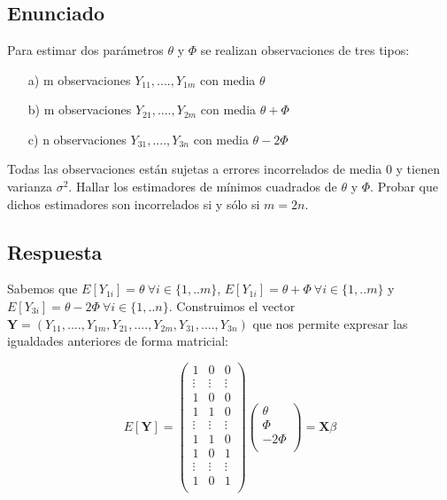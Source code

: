 \documentclass{article}
\begin{document}
\section{}

\subsection{Enunciado}

Para estimar dos parámetros $\theta$ y $\Phi$ se realizan observaciones de tres tipos:
\begin{enumerate}
    \item[a)] m observaciones $Y_{11}, .... , Y_{1m}$ con media $\theta$
    \item[b)] m observaciones $Y_{21}, .... , Y_{2m}$ con media $\theta + \Phi$ 
    \item[c)] n observaciones $Y_{31}, .... , Y_{3n}$ con media $ \theta - 2\Phi$
\end{enumerate}
Todas las observaciones están sujetas a errores incorrelados de media $0$ y tienen varianza $\sigma^2$. Hallar los estimadores de mínimos cuadrados de $\theta$ y $\Phi$. Probar que dichos estimadores son incorrelados si y sólo si $m=2n$.

\subsection{Respuesta}

Sabemos que $E[Y_{1i}] = \theta  \ \forall i \in \{1, .. m\}$, $E[Y_{1i}] = \theta + \Phi \ \forall i \in \{1, .. m\} $  y $E[Y_{3i}] = \theta - 2\Phi \ \forall i \in \{1, .. n\}$. Construimos el vector $\textbf{Y} = (Y_{11}, .... , Y_{1m},Y_{21}, .... , Y_{2m}, Y_{31}, .... , Y_{3n})$ que nos permite expresar las igualdades anteriores de forma matricial: 

\begin{equation}
E[\textbf{Y}] = 
\begin{pmatrix}
1  & 0 & 0\\
\vdots  & \vdots & \vdots\\
1  & 0 & 0\\
1  & 1 & 0\\
\vdots & \vdots & \vdots\\
1  & 1 & 0\\
1  & 0 & 1\\
\vdots & \vdots & \vdots\\
1  & 0 & 1\\

\end{pmatrix}
\begin{pmatrix}
\theta \\
 \Phi\\
- 2\Phi\\
\end{pmatrix}
= \textbf{X} \beta
\end{equation}
\end{document}
